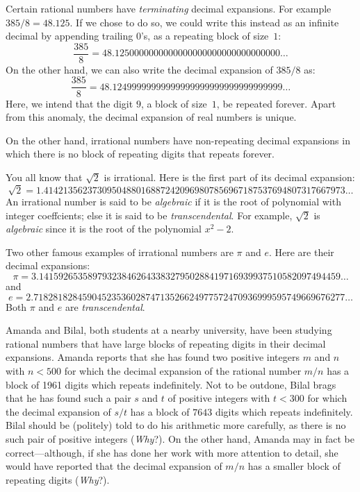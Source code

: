 Certain rational numbers have \textit{terminating} decimal expansions.
For example $385/8= 48.125$.  If we chose to do so, we could
write this instead as an infinite decimal by appending trailing $0$'s,
as a repeating block of size~$1$:
\[
\frac{385}{8} = 48.1250000000000000000000000000000000\dots
\]
On the other hand, we can also write the decimal expansion of
$385/8$ as:
\[
\frac{385}{8} = 48.12499999999999999999999999999999999\dots
\]
Here, we intend that the digit $9$, a block of size~$1$, be repeated forever.
Apart from this anomaly, the decimal expansion of real numbers is unique.

On the other hand, irrational numbers have non-repeating decimal 
expansions in which there is no block of repeating digits that
repeats forever.

You all know that $\sqrt{2}$ is irrational.  Here is the first part 
of its decimal expansion:
\[
\sqrt{2} =1.41421356237309504880168872420969807856967187537694807317667973\dots
\]
An irrational
number is said to be \textit{algebraic} if it is the root of
polynomial with integer coeffcients; else it is said to be
\textit{transcendental}.   
For example, $\sqrt{2}$ is \textit{algebraic} since it is the
root of the polynomial $x^2-2$.

Two other famous examples of irrational numbers are $\pi$ and $e$.
Here are their decimal expansions:
\[
\pi =3.14159265358979323846264338327950288419716939937510582097494459\dots
\]
and 
\[
e=2.7182818284590452353602874713526624977572470936999595749669676277\dots
\]
Both $\pi$ and $e$ are \textit{transcendental}.

\begin{example}
Amanda and Bilal, both students at a nearby university, have
been studying rational numbers that have
large blocks of repeating digits in their decimal expansions.
Amanda reports that she has found two positive integers
$m$ and $n$ with $n<500$ for which the decimal expansion
of the rational number $m/n$ has a block of 1961 digits which
repeats indefinitely.  Not to be outdone, Bilal brags that
he has found such a pair $s$ and $t$ of positive
integers with $t<300$ for which the
decimal expansion of $s/t$ has a block of $7643$ digits which
repeats indefinitely.  Bilal should be (politely) told to
do his arithmetic more carefully, as there is no such pair
of positive integers (\textit{Why}?).  On the other hand, Amanda may in fact
be correct---although, if she has done her work with more
attention to detail, she would have reported that the decimal
expansion of $m/n$ has a smaller block of repeating digits (\textit{Why}?).
\end{example}


